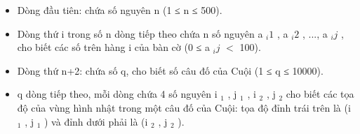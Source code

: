 \begin{itemize}
	\item Dòng đầu tiên: chứa số nguyên n (1 ≤ n ≤ 500).
	\item Dòng thứ i trong số n dòng tiếp theo chứa n số nguyên a $_ i1 $ , a $_ i2 $ , ..., a $_ ij $ , cho biết các số trên hàng i của bàn cờ (0 ≤ a $_ ij $ $<$ 100).
	\item Dòng thứ n+2: chứa số q, cho biết số câu đố của Cuội (1 ≤ q ≤ 10000).
	\item q dòng tiếp theo, mỗi dòng chứa 4 số nguyên i $_ 1 $ , j $_ 1 $ , i $_ 2 $ , j $_ 2 $ cho biết các tọa độ của vùng hình nhật trong một câu đố của Cuội: tọa độ đỉnh trái trên là (i $_ 1 $ , j $_ 1 $ ) và đỉnh dưới phải là (i $_ 2 $ , j $_ 2 $ ).
\end{itemize}
